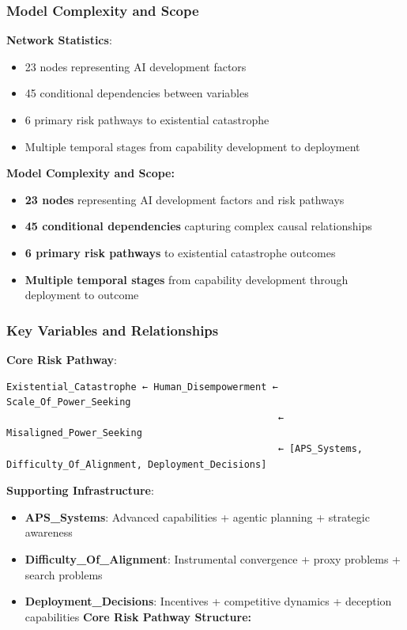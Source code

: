 \documentclass[
  11pt,
  letterpaper,
]{book}
\providecommand{\tightlist}{%
  \setlength{\itemsep}{0pt}\setlength{\parskip}{0pt}}
\begin{document}
\subsubsection{Model Complexity and
Scope}\label{sec-carlsmith-complexity}

\textbf{Network Statistics}:

\begin{itemize}
\tightlist
\item
  23 nodes representing AI development factors
\item
  45 conditional dependencies between variables
\item
  6 primary risk pathways to existential catastrophe
\item
  Multiple temporal stages from capability development to deployment
\end{itemize}

\textbf{Model Complexity and Scope:}

\begin{itemize}
\tightlist
\item
  \textbf{23 nodes} representing AI development factors and risk
  pathways
\item
  \textbf{45 conditional dependencies} capturing complex causal
  relationships
\item
  \textbf{6 primary risk pathways} to existential catastrophe outcomes
\item
  \textbf{Multiple temporal stages} from capability development through
  deployment to outcome
\end{itemize}

\subsubsection{Key Variables and
Relationships}\label{sec-carlsmith-variables}

\textbf{Core Risk Pathway}:

\begin{verbatim}
Existential_Catastrophe ← Human_Disempowerment ← Scale_Of_Power_Seeking
                                                ← Misaligned_Power_Seeking
                                                ← [APS_Systems, Difficulty_Of_Alignment, Deployment_Decisions]
\end{verbatim}

\textbf{Supporting Infrastructure}:

\begin{itemize}
\tightlist
\item
  \textbf{APS\_Systems}: Advanced capabilities + agentic planning +
  strategic awareness
\item
  \textbf{Difficulty\_Of\_Alignment}: Instrumental convergence + proxy
  problems + search problems
\item
  \textbf{Deployment\_Decisions}: Incentives + competitive dynamics +
  deception capabilities \textbf{Core Risk Pathway Structure:}
\end{itemize}
\end{document}
